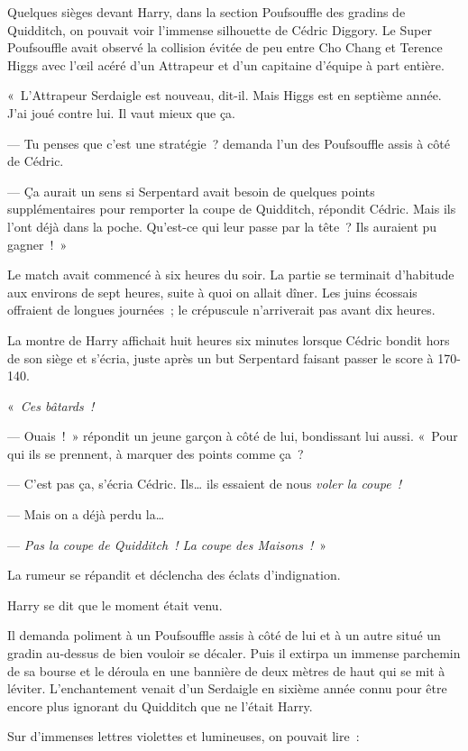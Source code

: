 Quelques sièges devant Harry, dans la section Poufsouffle des gradins de Quidditch, on pouvait voir l'immense silhouette de Cédric Diggory. Le Super Poufsouffle avait observé la collision évitée de peu entre Cho Chang et Terence Higgs avec l'œil acéré d'un Attrapeur et d'un capitaine d'équipe à part entière.

«~L'Attrapeur Serdaigle est nouveau, dit-il. Mais Higgs est en septième année. J'ai joué contre lui. Il vaut mieux que ça.

--- Tu penses que c'est une stratégie~? demanda l'un des Poufsouffle assis à côté de Cédric.

--- Ça aurait un sens si Serpentard avait besoin de quelques points supplémentaires pour remporter la coupe de Quidditch, répondit Cédric. Mais ils l'ont déjà dans la poche. Qu'est-ce qui leur passe par la tête~? Ils auraient pu gagner~!~»

Le match avait commencé à six heures du soir. La partie se terminait d'habitude aux environs de sept heures, suite à quoi on allait dîner. Les juins écossais offraient de longues journées~; le crépuscule n'arriverait pas avant dix heures.

La montre de Harry affichait huit heures six minutes lorsque Cédric bondit hors de son siège et s'écria, juste après un but Serpentard faisant passer le score à 170-140.

«~\emph{Ces bâtards~!}

--- Ouais~!~» répondit un jeune garçon à côté de lui, bondissant lui aussi. «~Pour qui ils se prennent, à marquer des points comme ça~?

--- C'est pas ça, s'écria Cédric. Ils… ils essaient de nous \emph{voler la coupe~!}

--- Mais on a déjà perdu la…

--- \emph{Pas la coupe de Quidditch~! La coupe des Maisons~!}~»

La rumeur se répandit et déclencha des éclats d'indignation.

Harry se dit que le moment était venu.

Il demanda poliment à un Poufsouffle assis à côté de lui et à un autre situé un gradin au-dessus de bien vouloir se décaler. Puis il extirpa un immense parchemin de sa bourse et le déroula en une bannière de deux mètres de haut qui se mit à léviter. L'enchantement venait d'un Serdaigle en sixième année connu pour être encore plus ignorant du Quidditch que ne l'était Harry.

Sur d'immenses lettres violettes et lumineuses, on pouvait lire~:

